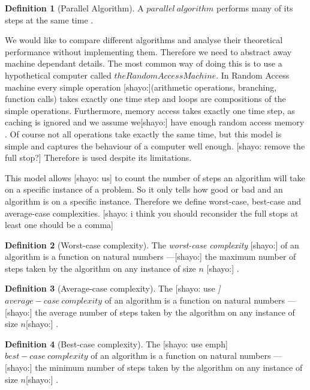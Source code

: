 \documentclass{report}
\theoremstyle{plain}
\theoremstyle{definition}
\newtheorem{definition}{Definition}
\theoremstyle{remark}
\numberwithin{definition}{chapter}
\numberwithin{example}{chapter}
\numberwithin{figure}{chapter}
\begin{document}
{\begin{definition}[Parallel Algorithm]
A $parallel \ algorithm$ performs many of its steps at the same time \cite{berman1996fundamentals}.
\end{definition}

We would like to compare different algorithms and analyse their theoretical performance without implementing them. Therefore we need to abstract away machine dependant details. The most common way of doing this is to use a hypothetical computer called $the Random Access Machine$. In Random Access machine every simple operation [shayo:](arithmetic operations, branching, function calls) takes exactly one time step and loops are compositions of the simple operations. Furthermore, memory access takes exactly one time step, as caching is ignored and we assume we[shayo:] have enough random access memory \cite{skiena504algorithm}. Of course not all operations take exactly the same time, but this model is simple and captures the behaviour of a computer well enough. [shayo: remove the full stop?] Therefore is used despite its limitations.

This model allows [shayo: us] to count the number of steps an algorithm will take on a specific instance of a problem. So it only tells how good or bad and an algorithm is on a specific instance. Therefore we define worst-case, best-case and average-case complexities. [shayo: i think you should reconsider the full stops at least one should be a comma]

\begin{definition}[Worst-case complexity]
The \emph{worst-case complexity} [shayo:] of an algorithm is a function on natural numbers ---[shayo:] the maximum number of steps taken by the algorithm on any instance of size $n$ [shayo:] \cite{skiena504algorithm}.
\end{definition}

\begin{definition}[Average-case complexity]
The [shayo: use \emph ]$average-case \ complexity$ of an algorithm is a function on natural numbers ---[shayo:] the average number of steps taken by the algorithm on any instance of size $n$[shayo:] \cite{skiena504algorithm}.
\end{definition}

\begin{definition}[Best-case complexity]
The [shayo: use emph] $best-case \ complexity$ of an algorithm is a function on natural numbers ---[shayo:] the minimum number of steps taken by the algorithm on any instance of size $n$[shayo:] \cite{skiena504algorithm}.
\end{definition}

}
\end{document}
